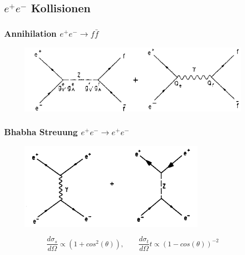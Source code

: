 \subsection{$e^+e^-$ Kollisionen}
\begin{frame}
	\frametitle{Annihilation $e^+e^- \rightarrow f\bar{f}$ }
	\begin{center}
		\begin{figure}
			\includegraphics[width=1.0\textwidth]{graphics/annihilation.png}
		\end{figure}
	\end{center}
\end{frame}
\begin{frame}
	\frametitle{Bhabha Streuung $e^+e^- \rightarrow e^+e^-$ }
	\begin{center}
		\begin{figure}
			\includegraphics[width=0.8\textwidth]{graphics/Bhabbastreuung.png}
		\end{figure}
	\end{center}
	\begin{equation*}
	\frac{d\sigma_s}{d\Omega} \propto (1+cos^2(\theta)),\qquad\frac{d\sigma_t}{d\Omega}t \propto (1-cos(\theta))^{-2}
	\end{equation*}
\end{frame}
